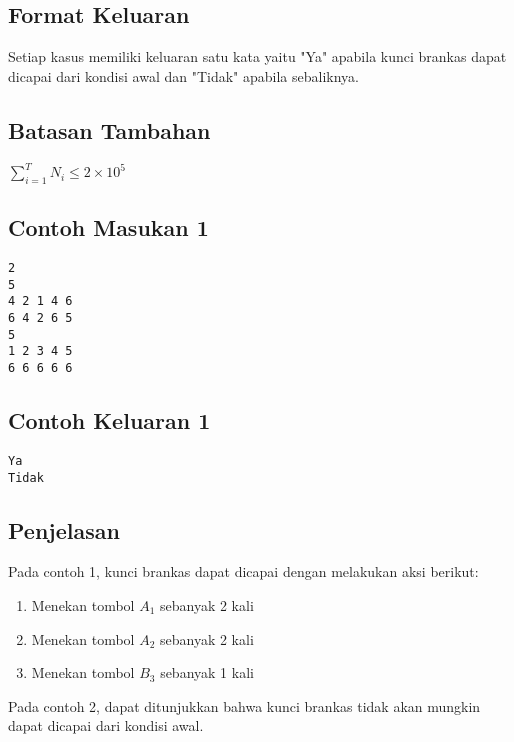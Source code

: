 \documentclass{article}
\begin{document}
\subsection*{Format Keluaran}

Setiap kasus memiliki keluaran satu kata yaitu "Ya" apabila kunci brankas dapat dicapai dari kondisi awal dan "Tidak" apabila sebaliknya.

\subsection*{Batasan Tambahan}
$\sum_{i=1}^T N_i \leq 2 \times 10^{5}$

\begin{multicols}{2}
\subsection*{Contoh Masukan 1}
\begin{lstlisting}
2
5
4 2 1 4 6
6 4 2 6 5
5
1 2 3 4 5
6 6 6 6 6
\end{lstlisting}
\columnbreak
\subsection*{Contoh Keluaran 1}
\begin{lstlisting}
Ya
Tidak
\end{lstlisting}
\vfill
\null
\end{multicols}


\subsection*{Penjelasan}

Pada contoh 1, kunci brankas dapat dicapai dengan melakukan aksi berikut:

\begin{enumerate}
\item Menekan tombol $A_1$ sebanyak 2 kali
\item Menekan tombol $A_2$ sebanyak 2 kali
\item Menekan tombol $B_3$ sebanyak 1 kali
\end{enumerate}

Pada contoh 2, dapat ditunjukkan bahwa kunci brankas tidak akan mungkin dapat dicapai dari kondisi awal.
\end{document}
